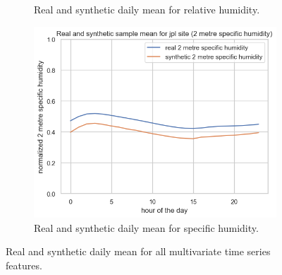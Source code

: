 \begin{figure}
\begin{subfigure}{.45\textwidth}
  \caption{Real and synthetic daily mean for relative humidity.}
  \label{fig:kwh}
\end{subfigure}
\hfill
\begin{subfigure}{.45\textwidth}
  \centering
  \includegraphics[width=.8\linewidth]{images/jpl_day_mean_shum.png}
  \caption{Real and synthetic daily mean for specific humidity.}
  \label{fig:ct}
\end{subfigure}
\caption{Real and synthetic daily mean for all multivariate time series features.}
\label{fig:all acn}
\end{figure}

